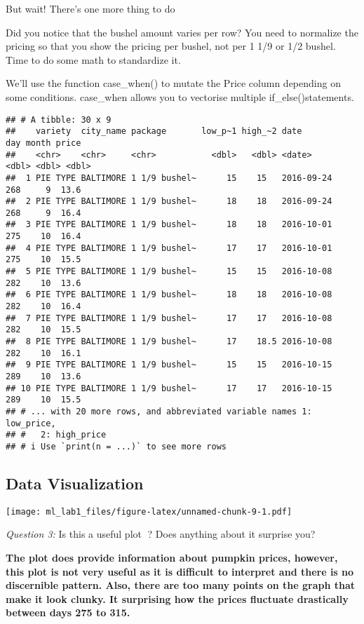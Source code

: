 \documentclass[
]{article}
\begin{document}
But wait! There's one more thing to do

Did you notice that the bushel amount varies per row? You need to
normalize the pricing so that you show the pricing per bushel, not per 1
1/9 or 1/2 bushel. Time to do some math to standardize it.

We'll use the function case\_when() to mutate the Price column depending
on some conditions. case\_when allows you to vectorise multiple
if\_else()statements.

\begin{verbatim}
## # A tibble: 30 x 9
##    variety  city_name package       low_p~1 high_~2 date         day month price
##    <chr>    <chr>     <chr>           <dbl>   <dbl> <date>     <dbl> <dbl> <dbl>
##  1 PIE TYPE BALTIMORE 1 1/9 bushel~      15    15   2016-09-24   268     9  13.6
##  2 PIE TYPE BALTIMORE 1 1/9 bushel~      18    18   2016-09-24   268     9  16.4
##  3 PIE TYPE BALTIMORE 1 1/9 bushel~      18    18   2016-10-01   275    10  16.4
##  4 PIE TYPE BALTIMORE 1 1/9 bushel~      17    17   2016-10-01   275    10  15.5
##  5 PIE TYPE BALTIMORE 1 1/9 bushel~      15    15   2016-10-08   282    10  13.6
##  6 PIE TYPE BALTIMORE 1 1/9 bushel~      18    18   2016-10-08   282    10  16.4
##  7 PIE TYPE BALTIMORE 1 1/9 bushel~      17    17   2016-10-08   282    10  15.5
##  8 PIE TYPE BALTIMORE 1 1/9 bushel~      17    18.5 2016-10-08   282    10  16.1
##  9 PIE TYPE BALTIMORE 1 1/9 bushel~      15    15   2016-10-15   289    10  13.6
## 10 PIE TYPE BALTIMORE 1 1/9 bushel~      17    17   2016-10-15   289    10  15.5
## # ... with 20 more rows, and abbreviated variable names 1: low_price,
## #   2: high_price
## # i Use `print(n = ...)` to see more rows
\end{verbatim}

\hypertarget{data-visualization}{%
\subsection{Data Visualization}\label{data-visualization}}

\texttt{[image: ml\_lab1\_files/figure-latex/unnamed-chunk-9-1.pdf]}

\emph{Question 3:} Is this a useful plot 🤷? Does anything about it
surprise you?

\textbf{The plot does provide information about pumpkin prices, however,
this plot is not very useful as it is difficult to interpret and there
is no discernible pattern. Also, there are too many points on the graph
that make it look clunky. It surprising how the prices fluctuate
drastically between days 275 to 315.}
\end{document}
